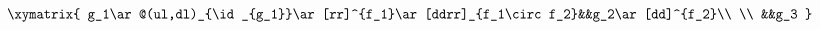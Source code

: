 \begin{equation}
\begin{aligned}
\xymatrix{
  g_1\ar@(ul,dl)_{\id_{g_1}}\ar[rr]^{f_1}\ar[ddrr]_{f_1\circ f_2}&&g_2\ar[dd]^{f_2}\\
  \\
  &&g_3
}
\end{aligned}
\end{equation}

